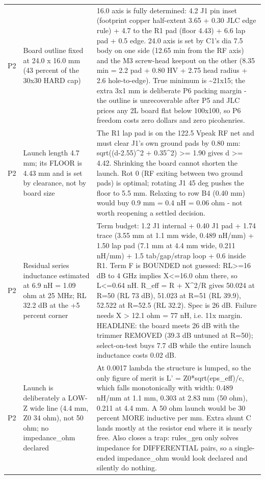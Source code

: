 \documentclass[11pt,a4paper]{article}
\begin{document}
{\begin{longtable}{lp{5.2cm}p{7.2cm}}
P2 & Board outline fixed at 24.0 x 16.0 mm (43 percent of the 30x30 HARD cap) & 16.0 axis is fully determined: 4.2 J1 pin inset (footprint copper half-extent 3.65 + 0.30 JLC edge rule) + 4.7 to the R1 pad (floor 4.43) + 6.6 lap pad + 0.5 edge. 24.0 axis is set by C1's dia 7.5 body on one side (12.65 min from the RF axis) and the M3 screw-head keepout on the other (8.35 min = 2.2 pad + 0.80 HV + 2.75 head radius + 2.6 hole-to-edge). True minimum is \textasciitilde{}21x15; the extra 3x1 mm is deliberate P6 packing margin - the outline is unrecoverable after P5 and JLC prices any 2L board flat below 100x100, so P6 freedom costs zero dollars and zero picohenries. \\
P2 & Launch length 4.7 mm; its FLOOR is 4.43 mm and is set by clearance, not by board size & The R1 lap pad is on the 122.5 Vpeak RF net and must clear J1's own ground pads by 0.80 mm: sqrt((d-2.55)\textasciicircum{}2 + 0.35\textasciicircum{}2) \textgreater{}= 1.90 gives d \textgreater{}= 4.42. Shrinking the board cannot shorten the launch. Rot 0 (RF exiting between two ground pads) is optimal; rotating J1 45 deg pushes the floor to 5.5 mm. Relaxing to row B4 (0.40 mm) would buy 0.9 mm = 0.4 nH = 0.06 ohm - not worth reopening a settled decision. \\
P2 & Residual series inductance estimated at 6.9 nH = 1.09 ohm at 25 MHz; RL 32.2 dB at the +5 percent corner & Term budget: 1.2 J1 internal + 0.40 J1 pad + 1.74 trace (3.55 mm at 1.1 mm wide, 0.489 nH/mm) + 1.50 lap pad (7.1 mm at 4.4 mm wide, 0.211 nH/mm) + 1.5 tab/gap/strap loop + 0.6 inside R1. Term F is BOUNDED not guessed: RL\textgreater{}=16 dB to 4 GHz implies X\textless{}=16.0 ohm there, so L\textless{}=0.64 nH. R\_eff = R + X\textasciicircum{}2/R gives 50.024 at R=50 (RL 73 dB), 51.023 at R=51 (RL 39.9), 52.522 at R=52.5 (RL 32.2). Spec is 26 dB. Failure needs X \textgreater{} 12.1 ohm = 77 nH, i.e. 11x margin. HEADLINE: the board meets 26 dB with the trimmer REMOVED (39.3 dB untuned at R=50); select-on-test buys 7.7 dB while the entire launch inductance costs 0.02 dB. \\
P2 & Launch is deliberately a LOW-Z wide line (4.4 mm, Z0 34 ohm), not 50 ohm; no impedance\_ohm declared & At 0.0017 lambda the structure is lumped, so the only figure of merit is L' = Z0{*}sqrt(eps\_eff)/c, which falls monotonically with width: 0.489 nH/mm at 1.1 mm, 0.303 at 2.83 mm (50 ohm), 0.211 at 4.4 mm. A 50 ohm launch would be 30 percent MORE inductive per mm. Extra shunt C lands mostly at the resistor end where it is nearly free. Also closes a trap: rules\_gen only solves impedance for DIFFERENTIAL pairs, so a single-ended impedance\_ohm would look declared and silently do nothing. \\

\end{longtable}}
\end{document}
